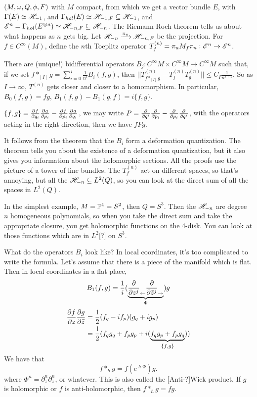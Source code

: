  $(M,\omega,Q,\phi,F)$ with $M$ compact, from which we get a vector bundle $E$, with
 $\Gamma(E)\simeq\mathscr{H}_{-1}$, and $\Gamma_{hol}(E)\simeq \mathscr{H}_{-1,F} \subseteq \mathscr{H}_{-1}$, and
 $\mathscr{E}^n=\Gamma_{hol}(E^{\otimes n})\simeq \mathscr{H}_{-n,F}\subseteq \mathscr{H}_{-n}$.  The Riemann-Roch theorem tells us
 about what happens as $n$ gets big.  Let $\mathscr{H}_{-n}\xrightarrow{\pi_n} \mathscr{H}_{-n,F}$ be
 the projection.  For $f\in C^\infty(M)$, define the $n$th Toeplitz operator $T_f^{(n)} = \pi_n M_f
 \pi_n: \mathscr{E}^n\to \mathscr{E}^n$.
 \begin{theorem}
   There are (unique!) bidifferential operators $B_j:C^\infty{M}\times C^\infty{M} \to
   C^\infty{M}$ such that, if we set $f\ast_{[I]}g = \sum_{i=0}^I \frac{1}{n^i}
   B_i(f,g)$, then $||T^{(n)}_{f\ast_{[I]} g}-T^{(n)}_fT^{(n)}_g||\le
   C_{I}\frac{1}{n^{I+1}}$.  So as $I\to \infty$, $T^{(n)}$ gets closer and closer to
   a homomorphism.  In particular, $B_0(f,g)=fg$, $B_1(f,g) -B_1(g,f) = i\{f,g\}$.
 \end{theorem}
 $\{f,g\} = \frac{\partial f}{\partial q_i} \frac{\partial g}{\partial p_i} - \frac{\partial f}{\partial p_i} \frac{\partial g}{\partial q_i}$, we may write
 $P = \frac{\partial }{\partial q^i}\frac{\partial }{\partial p_i} - \frac{\partial }{\partial p_i}\frac{\partial }{\partial q^i}$, with the operators acting
 in the right direction, then we have $fPg$.

 It follows from the theorem that the $B_i$ form a deformation quantization.  The
 theorem tells you about the existence of a deformation quantization, but it also gives
 you information about the holomorphic sections.  All the proofs use the picture of a
 tower of line bundles.  The $T^{(n)}_f$ act on different spaces, so that's annoying,
 but all the $\mathscr{H}_{-n}\subseteq L^2(Q)$, so you can look at the direct sum of all the
 spaces in $L^2(Q)$.

 In the simplest example, $M=\mathbb{P}^1=S^2$, then $Q=S^3$.  Then the $\mathscr{H}_{-n}$ are degree
 $n$ homogeneous polynomials, so when you take the direct sum and take the appropriate
 closure, you get holomorphic functions on the 4-disk.  You can look at those
 functions which are in $L^2$[?] on $S^3$.

 What do the operators $B_i$ look like?  In local coordinates, it's too complicated to
 write the formula.  Let's assume that there is a piece of the manifold which is flat.
 Then in local coordinates in a flat place,
 \[
    B_1(f,g) = \frac{1}{i}(\underbrace{\frac{\partial }{\partial z^j}_{\leftarrow}\frac{\partial }{\partial \bar z^j}_\to }_\Phi) g
 \]
 \begin{align*}
    \frac{\partial f}{\partial z}\frac{\partial g}{\partial \bar z} &= \frac{1}{2}(f_q-if_p)(g_q+ig_p)\\
        &= \frac{1}{2}(f_qg_q+f_pg_p+i(\underbrace{f_qg_p+f_pg_q}_{\{f,g\}}))
 \end{align*}
 We have that
 \[
    f\ast_\hslash g = f(e^{\hslash \Phi})g.
 \]
 where $\Phi^n = \partial_z^n \partial_{\bar z}^n$, or whatever.
 This is also called the [Anti-?]Wick product.  If $g$ is holomorphic or $f$ is
 anti-holomorphic, then $f\ast_\hslash g=fg$.

